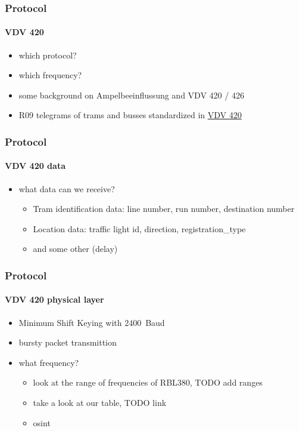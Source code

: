 \documentclass[aspectratio=169]{beamer}
\begin{document}

\begin{frame}
\frametitle{Protocol}
\framesubtitle{VDV 420}
	\begin{itemize}
		\item which protocol?
		\item which frequency?
		\item some background on Ampelbeeinflussung and VDV 420 / 426
		\item R09 telegrams of trams and busses standardized in \href{https://knowhow.vdv.de/documents/420/}{VDV 420}
	\end{itemize}
\end{frame}


\begin{frame}
\frametitle{Protocol}
\framesubtitle{VDV 420 data}
\begin{itemize}
	\item what data can we receive?
	\begin{itemize}
		\item Tram identification data: line number, run number, destination number
		\item Location data: traffic light id, direction, registration\_type
		\item and some other (delay)
	\end{itemize}
\end{itemize}
\end{frame}


\begin{frame}
\frametitle{Protocol}
\framesubtitle{VDV 420 physical layer}
\begin{itemize}
	\item Minimum Shift Keying with \SI{2400}{Baud}
	\item bursty packet transmittion
		\item what frequency?
		\begin{itemize}
			\item look at the range of frequencies of RBL380, TODO add ranges
			\item take a look at our table, TODO link
			\item osint
		\end{itemize}
\end{itemize}
\end{frame}
\end{document}
